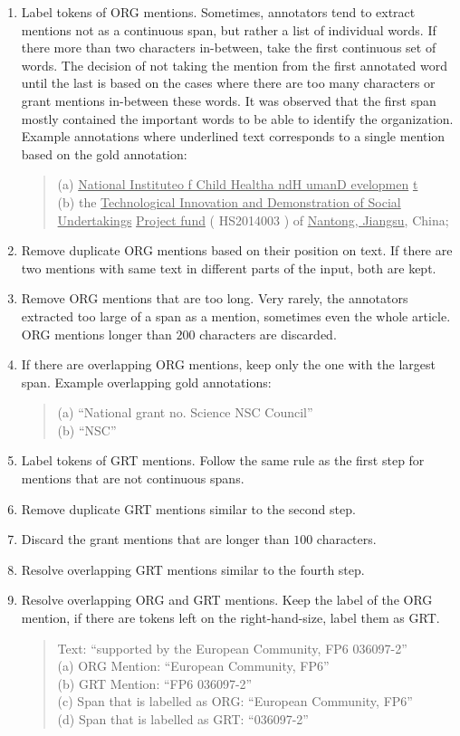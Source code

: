 \documentclass{report}
\theoremstyle{definition}
\theoremstyle{remark}
\begin{document}
\begin{enumerate}
    \item Label tokens of ORG mentions. Sometimes, annotators tend to extract mentions not as a continuous span, but rather a list of individual words. If there more than two characters in-between, take the first continuous set of words. The decision of not taking the mention from the first annotated word until the last is based on the cases where there are too many characters or grant mentions in-between these words. It was observed that the first span mostly contained the important words to be able to identify the organization. Example annotations where underlined text corresponds to a single mention based on the gold annotation:
    \begin{quote}
        (a) \underline{National Instituteo f Child Healtha ndH umanD evelopmen} \underline{t} \\
        (b) the \underline{Technological Innovation and Demonstration of Social Undertakings} \underline{Project fund} ( HS2014003 ) of \underline{Nantong, Jiangsu}, China;
    \end{quote}

    \item Remove duplicate ORG mentions based on their position on text. If there are two mentions with same text in different parts of the input, both are kept.
    \item Remove ORG mentions that are too long. Very rarely, the annotators extracted too large of a span as a mention, sometimes even the whole article. ORG mentions longer than $200$ characters are discarded.
    \item If there are overlapping ORG mentions, keep only the one with the largest span. Example overlapping gold annotations:
    \begin{quote}
        (a) ``National grant no. Science NSC Council'' \\
        (b) ``NSC''
    \end{quote}
    \item Label tokens of GRT mentions. Follow the same rule as the first step for mentions that are not continuous spans.
    \item Remove duplicate GRT mentions similar to the second step.
    \item Discard the grant mentions that are longer than $100$ characters. 
    \item Resolve overlapping GRT mentions similar to the fourth step.
    \item Resolve overlapping ORG and GRT mentions. Keep the label of the ORG mention, if there are tokens left on the right-hand-size, label them as GRT. 
    \begin{quote}
        Text: ``supported by the European Community, FP6 036097-2'' \\
        (a) ORG Mention: ``European Community, FP6'' \\
        (b) GRT Mention: ``FP6 036097-2'' \\
        (c) Span that is labelled as ORG: ``European Community, FP6'' \\
        (d) Span that is labelled as GRT: ``036097-2''
    \end{quote}
\end{enumerate}
\end{document}
